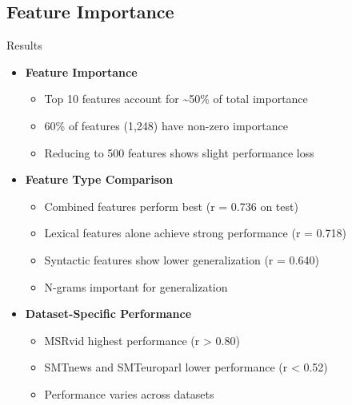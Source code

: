 \documentclass{beamer}
\begin{document}
\subsection{Feature Importance}
\begin{frame}{Results}
    \begin{itemize}
        \item \textbf{Feature Importance}
        \begin{itemize}
            \item Top 10 features account for \textasciitilde{}50\% of total importance
            \item 60\% of features (1,248) have non-zero importance
            \item Reducing to 500 features shows slight performance loss
        \end{itemize}
        \item \textbf{Feature Type Comparison}
        \begin{itemize}
            \item Combined features perform best (r = 0.736 on test)
            \item Lexical features alone achieve strong performance (r = 0.718)
            \item Syntactic features show lower generalization (r = 0.640)
            \item N-grams important for generalization
        \end{itemize}
        \item \textbf{Dataset-Specific Performance}
        \begin{itemize}
            \item MSRvid highest performance (r \textgreater{} 0.80)
            \item SMTnews and SMTeuroparl lower performance (r \textless{} 0.52)
            \item Performance varies across datasets
        \end{itemize}
    \end{itemize}
\end{frame}
\end{document}
